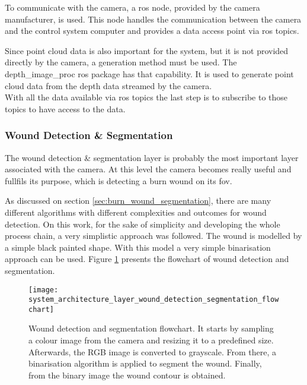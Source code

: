 To communicate with the camera, a \gls{ros} node, provided by the camera manufacturer, is used. This node handles the communication between the camera and the control system computer and provides a data access point via \gls{ros} topics.

Since point cloud data is also important for the system, but it is not provided directly by the camera, a generation method must be used. The depth\_image\_proc \gls{ros} package has that capability. It is used to generate point cloud data from the depth data streamed by the camera.\\

With all the data available via \gls{ros} topics the last step is to subscribe to those topics to have access to the data.


\subsubsection*{Wound Detection \& Segmentation}
\label{subsubsec:system_architectural_camera_layers_wound_detection_segmentation}

The wound detection \& segmentation layer is probably the most important layer associated with the camera. At this level the camera becomes really useful and fullfils its purpose, which is detecting a burn wound on its \gls{fov}.

As discussed on section \ref{sec:burn_wound_segmentation}, there are many different algorithms with different complexities and outcomes for wound detection. On this work, for the sake of simplicity and developing the whole process chain, a very simplistic approach was followed. The wound is modelled by a simple black painted shape. With this model a very simple binarisation approach can be used. Figure \ref{fig:system_architecture_layer_wound_detection_segmentation_flowchart} presents the flowchart of wound detection and segmentation.\\

\begin{figure}[htbp]
	\centering
	\texttt{[image: system\_architecture\_layer\_wound\_detection\_segmentation\_flowchart]}
	\caption{Wound detection and segmentation flowchart. It starts by sampling a colour image from the camera and resizing it to a predefined size. Afterwards, the RGB image is converted to grayscale. From there, a binarisation algorithm is applied to segment the wound. Finally, from the binary image the wound contour is obtained.}
	\label{fig:system_architecture_layer_wound_detection_segmentation_flowchart}
\end{figure}

